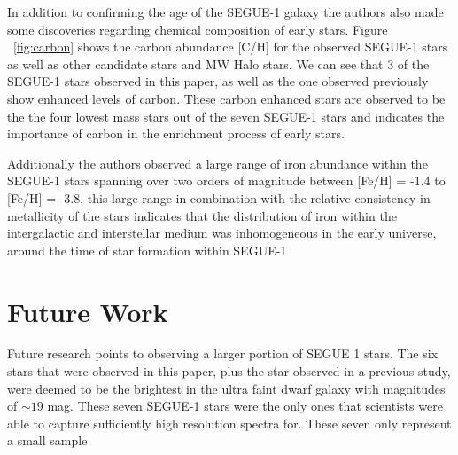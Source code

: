 \documentclass{aastex631}
\begin{document}
In addition to confirming the age of the SEGUE-1 galaxy the authors also made some discoveries regarding chemical composition of early
stars. Figure ~\ref{fig:carbon} shows the carbon abundance [C/H] for the observed SEGUE-1 stars as well as other candidate stars and
MW Halo stars. We can see that 3 of the SEGUE-1 stars observed in this paper, as well as the one observed previously show enhanced levels
of carbon. These carbon enhanced stars are observed to be the the four lowest mass stars out of the seven SEGUE-1 stars and indicates the
importance of carbon in the enrichment process of early stars.

Additionally the authors observed a large range of iron abundance within the SEGUE-1 stars spanning over two orders of magnitude between
[Fe/H] = -1.4 to [Fe/H] = -3.8. this large range in combination with the relative consistency in metallicity of the stars indicates that
the distribution of iron within the intergalactic and interstellar medium was inhomogeneous in the early universe, around the time of
star formation within SEGUE-1

\section{Future Work} \label{sec:future}

Future research points to observing a larger portion of SEGUE 1 stars. The six stars that were observed in this paper, plus the 
star observed in a previous study, were deemed to be the brightest in the ultra faint dwarf galaxy with magnitudes of $\sim 19$ mag.
These seven SEGUE-1 stars were the only ones that scientists were able to capture sufficiently high resolution spectra for. These seven
only represent a small sample 

\newpage


\nocite{*}
{}



\end{document}
